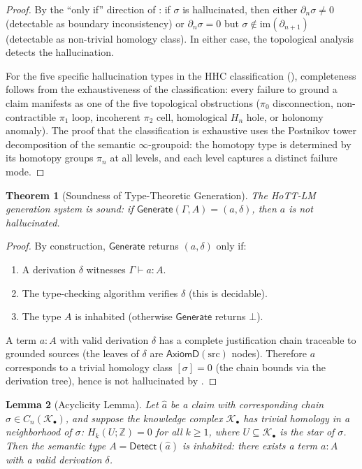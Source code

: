 \documentclass[11pt,a4paper]{article}
\theoremstyle{plain}
\newtheorem{theorem}{Theorem}[section]
\newtheorem{lemma}[theorem]{Lemma}
\theoremstyle{definition}
\theoremstyle{remark}
\newcommand{\im}{\mathrm{im}}
\newcommand{\Detect}{\mathsf{Detect}}
\newcommand{\Generate}{\mathsf{Generate}}
\begin{document}
\begin{proof}
By the ``only if'' direction of : if $\sigma$ is hallucinated, then either $\partial_n \sigma \neq 0$ (detectable as boundary inconsistency) or $\partial_n \sigma = 0$ but $\sigma \notin \im(\partial_{n+1})$ (detectable as non-trivial homology class). In either case, the topological analysis detects the hallucination.

For the five specific hallucination types in the HHC classification (), completeness follows from the exhaustiveness of the classification: every failure to ground a claim manifests as one of the five topological obstructions ($\pi_0$ disconnection, non-contractible $\pi_1$ loop, incoherent $\pi_2$ cell, homological $H_n$ hole, or holonomy anomaly). The proof that the classification is exhaustive uses the Postnikov tower decomposition of the semantic $\infty$-groupoid: the homotopy type is determined by its homotopy groups $\pi_n$ at all levels, and each level captures a distinct failure mode.
\end{proof}

\begin{theorem}[Soundness of Type-Theoretic Generation]\label{thm:generation-soundness}
The HoTT-LM generation system is sound: if $\Generate(\Gamma, A) = (a, \delta)$, then $a$ is not hallucinated.
\end{theorem}

\begin{proof}
By construction, $\Generate$ returns $(a, \delta)$ only if:
\begin{enumerate}[nosep]
  \item A derivation $\delta$ witnesses $\Gamma \vdash a : A$.
  \item The type-checking algorithm verifies $\delta$ (this is decidable).
  \item The type $A$ is inhabited (otherwise $\Generate$ returns $\bot$).
\end{enumerate}
A term $a : A$ with valid derivation $\delta$ has a complete justification chain traceable to grounded sources (the leaves of $\delta$ are $\mathsf{AxiomD}(\text{src})$ nodes). Therefore $a$ corresponds to a trivial homology class $[\sigma] = 0$ (the chain bounds via the derivation tree), hence is not hallucinated by .
\end{proof}

\begin{lemma}[Acyclicity Lemma]\label{lem:acyclicity}
Let $\hat{a}$ be a claim with corresponding chain $\sigma \in C_n(\mathcal{K}_\bullet)$, and suppose the knowledge complex $\mathcal{K}_\bullet$ has trivial homology in a neighborhood of $\sigma$: $H_k(U; \mathbb{Z}) = 0$ for all $k \geq 1$, where $U \subseteq \mathcal{K}_\bullet$ is the star of $\sigma$. Then the semantic type $A = \Detect(\hat{a})$ is inhabited: there exists a term $a : A$ with a valid derivation $\delta$.
\end{lemma}
\end{document}
